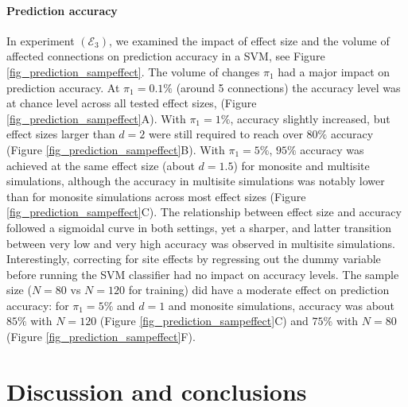 \documentclass[authoryear]{elsarticle}
\begin{document}
\paragraph{Prediction accuracy}
In experiment $(\mathcal{E}_3)$, we examined the impact of effect size and the volume of affected connections on prediction accuracy in a SVM, see Figure \ref{fig_prediction_sampeffect}. The volume of changes $\pi_1$ had a major impact on prediction accuracy. At $\pi_1=0.1\%$ (around 5 connections) the accuracy level was at chance level across all tested effect sizes, (Figure \ref{fig_prediction_sampeffect}A). With $\pi_1=1\%$, accuracy slightly increased, but effect sizes larger than $d=2$ were still required to reach over $80\%$ accuracy (Figure \ref{fig_prediction_sampeffect}B). With $\pi_1=5\%$, $95\%$ accuracy was achieved at the same effect size (about $d=1.5$) for monosite and multisite simulations, although the accuracy in multisite simulations was notably lower than for monosite simulations across most effect sizes (Figure \ref{fig_prediction_sampeffect}C). The relationship between effect size and accuracy followed a sigmoidal curve in both settings, yet a sharper, and latter transition between very low and very high accuracy was observed in multisite simulations. Interestingly, correcting for site effects by regressing out the dummy variable before running the SVM classifier had no impact on accuracy levels. The sample size ($N=80$ vs $N=120$ for training) did have a moderate effect on prediction accuracy: for $\pi_1=5\%$ and $d=1$ and monosite simulations, accuracy was about $85\%$ with $N=120$ (Figure \ref{fig_prediction_sampeffect}C) and $75\%$ with $N=80$ (Figure \ref{fig_prediction_sampeffect}F).


\section{Discussion and conclusions}
\end{document}
